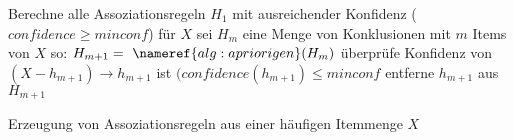 \begin{algorithm} [H]
\label{alg:erzeugen_assozationsregeln}
Berechne alle Assoziationsregeln $H_1$ mit ausreichender Konfidenz ($confidence \geq minconf$) für $X$\;
sei $H_m$ eine Menge von Konklusionen mit $m$ Items von $X$ so:
	$H_{m+1} = ~\nameref{alg:apriorigen}(H_{m})$\;
 {
überprüfe Konfidenz von $(X-h_{m+1}) \rightarrow h_{m+1}$\;
ist $(confidence(h_{m+1}) \leq minconf$ entferne $h_{m+1}$ aus $H_{m+1}$\;
}
\caption{Erzeugung von Assoziationsregeln aus einer häufigen Itemmenge $X$}
\end{algorithm}
\bigskip
\parencite[s.][S. 179ff]{TU_Dortmund}

